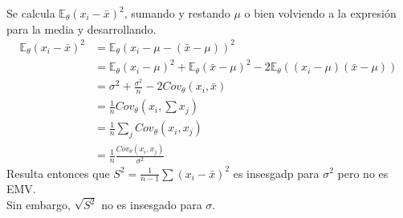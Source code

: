\documentclass[10pt]{article}
\theoremstyle{plain}
\theoremstyle{definition}
\begin{document}
Se calcula $\mathbb{E}_{\theta}(x_{i}-\bar{x})^2$, sumando y restando $\mu$ o bien volviendo a la expresión para la media y desarrollando.
\begin{align*}
\mathbb{E}_{\theta}(x_{i}-\bar{x})^2 &= \mathbb{E}_{\theta}(x_{i}-\mu - (\bar{x}-\mu))^2\\
&= \mathbb{E}_{\theta}(x_{i}-\mu)^2 + \mathbb{E}_{\theta}(\bar{x}-\mu)^2 - 2\mathbb{E}_{\theta}((x_{i}-\mu)(\bar{x}-\mu))\\
&= \sigma^2 + \frac{\sigma^2}{n} - 2 Cov_{\theta}(x_{i},\bar{x})\\
&= \frac{1}{n} Cov_{\theta}(x_{i},\sum x_{j})\\
&= \frac{1}{n} \sum_{j} Cov_{\theta}(x_{i},x_{j})\\
&= \frac{1}{n} \frac{Cov_{\theta}(x_{i},x_{j})}{\sigma^2}
\end{align*}
Resulta entonces que $S^2 = \frac{1}{n-1}\sum (x_{i}-\bar{x})^2$ es insesgadp para $\sigma^2$ pero no es EMV.\\
Sin embargo, $\sqrt{S^2}$ no es insesgado para $\sigma$.
\end{document}
